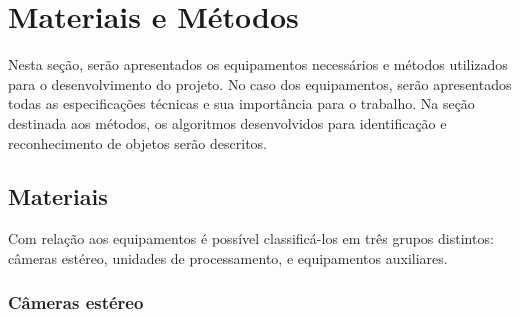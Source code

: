 \chapter{Materiais e Métodos}
\label{Materiais}


Nesta seção, serão apresentados os equipamentos necessários e métodos utilizados para o desenvolvimento do projeto. No caso dos equipamentos, serão apresentados todas as especificações técnicas e sua importância para o trabalho. Na seção destinada aos métodos, os algoritmos desenvolvidos para identificação e reconhecimento de objetos serão descritos.


\section{Materiais}

Com relação aos equipamentos é possível classificá-los em três grupos distintos: câmeras estéreo, unidades de processamento, e equipamentos auxiliares.


\subsection{Câmeras estéreo}

